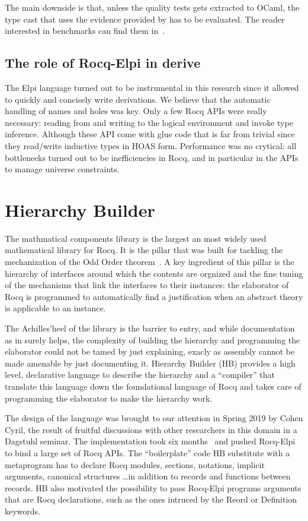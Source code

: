 \documentclass[a4paper, 11pt]{book}
\begin{document}
The main downside is that, unless the quality tests gets extracted to
OCaml, the type cast that uses the evidence provided by 
has to be evaluated. The reader interested in benchmarks
can find them in~\cite{gregoire:hal-03800154}.

\subsection{The role of Rocq-Elpi in derive}
The Elpi language turned out to be instrumental in this research since
it allowed to quickly and concisely write derivations. We believe that
the automatic handling of names and holes was key. Only a few Rocq APIs were
really necessary: reading from and writing to the logical environment and
invoke type inference. Although these API come with glue code that is far from
trivial since they read/write inductive types in HOAS form.
Performance was no crytical: all bottlenecks turned out to be inefficiencies
in Rocq, and in particular in the APIs to manage universe constraints.


\section{Hierarchy Builder}\label{sec:hb}

The mathmatical components library is the largest an most widely used
mathematical library for Rocq. It is the pillar that was built for
tackling the mechanization of the Odd Order theorem~\cite{}.
A key ingredient of this pillar is the hierarchy of interfaces around which
the contents are orgnized and the fine tuning of the mechanisms that
link the interfaces to their instances: the elaborator of Rocq is
programmed to automatically find a justification when an abstract theory
is applicable to an instance.

The Achilles'heel of the library is the barrier to entry, and while
documentation as in \cite{assia_mahboubi_2022_7118596} surely helps,
the complexity of building the hierarchy and programming the elaborator
could not be tamed by just explaining, exacly as assembly cannot be made
amenable by just documenting it. Hierarchy Builder (HB) provides a high level,
declarative language to describe the hierarchy and a ``compiler'' that
translate this language down the foundational language of Rocq and takes
care of programming the elaborator to make the hierarchy work.

The design of the language was brought to our attention in Spring 2019
by Cohen Cyril, the result of fruitful discussions with other
researchers in this domain in a Dagstuhl seminar. The implementation
took six months~\cite{cohen_et_al:LIPIcs.FSCD.2020.34} and pushed
Rocq-Elpi to bind a large set of Rocq APIs. The ``boilerplate'' code
HB substitute with a metaprogram has to declare Rocq modules, sections,
notations, implicit arguments, canonical structures \ldots in addition
to records and functions between records. HB also motivated the possibility
to pass Rocq-Elpi programs arguments that are Rocq declarations, such as the ones intruced by
the Reord or Definition keywords.
\end{document}
